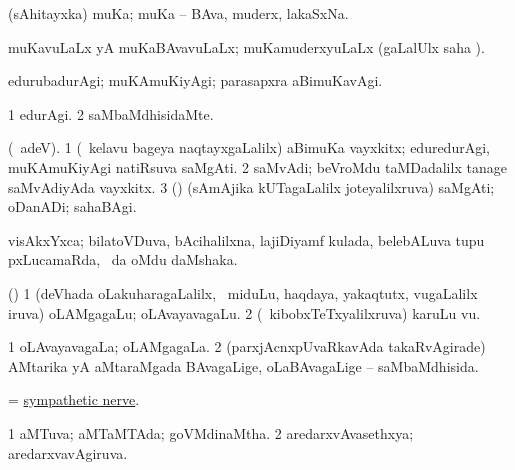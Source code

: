 \bentry
{} 
\gl{\nA}
\expl{}
\bmng
 (sAhitayxka) muKa; muKa -- BAva, muderx, lakaSxNa. 
\emng
\eentry

\bentry 
{} 
\gl{\gu}
\expl{}
\bmng
muKavuLaLx yA muKaBAvavuLaLx; muKamuderxyuLaLx (\saMpa gaLalUlx saha \parx). 
\emng
\eentry

\bentry 
{} 
\gl{\kirxvi}
\expl{\F}
\bmng
edurubadurAgi; muKAmuKiyAgi; parasapxra aBimuKavAgi. 
\emng
\eentry

\bentry 
{} 
\gl{\upa}
\expl{\F\ }
\bmng
\bnum
\num{1} edurAgi. 
\num{2} saMbaMdhisidaMte. 
\enum
\emng
\eentry

\bentry 
{} 
\gl{\nA}
\expl{\F}
\bmng
(\bava\ adeV). 
\bnum
\num{1} (\kanmu\ kelavu bageya naqtayxgaLalilx) aBimuKa vayxkitx; eduredurAgi, muKAmuKiyAgi natiRsuva saMgAti. 
\num{2} saMvAdi; beVroMdu taMDadalilx tanage saMvAdiyAda vayxkitx. 
\num{3} (\ame) (sAmAjika kUTagaLalilx joteyalilxruva) saMgAti; oDanADi; sahaBAgi. 
\enum
\emng
\eentry

\bentry 
{} 
\pron{}
\gl{\saMkiSx}
\expl{}
\bmng
{} 
\emng
\eentry

\bentry
{} 
\gl{\nA}
\expl{}
\bmng
 visAkxYxca; bilatoVDuva, bAcihalilxna, lajiDiyamf kulada, belebALuva tupu pxLucamaRda, \da\ \ame da oMdu daMshaka. 
\emng
\eentry

\bentry 
{} 
\gl{\nA}
\expl{}
\bmng
 (\bava) 
\bnum
\num{1} (deVhada oLakuharagaLalilx, \udA\ miduLu, haqdaya, yakaqtutx, \mo vugaLalilx iruva) oLAMgagaLu; oLAvayavagaLu. 
\num{2} (\kanmu\ kibobxTeTxyalilxruva) karuLu \mo vu. 
\enum
\emng
\eentry

\bentry 
{} 
\gl{\gu}
\expl{}
\bmng
\bnum
\num{1} oLAvayavagaLa; oLAMgagaLa. 
\num{2} (parxjAcnxpUvaRkavAda takaRvAgirade) AMtarika yA aMtaraMgada BAvagaLige, oLaBAvagaLige -- saMbaMdhisida. 
\enum
\emng
\eentry

\bentry 
{}
\gl{\nA}
\expl{}
\bmng
 = \hyperref{kandict_s.pdf}{S}{sympathetic nerve}{sympathetic nerve}. 
\emng
\eentry

\bentry 
{} 
\gl{\gu}
\expl{}
\bmng
\bnum
\num{1} aMTuva; aMTaMTAda; goVMdinaMtha. 
\num{2} aredarxvAvasethxya; aredarxvavAgiruva. 
\enum
\emng
\eentry

